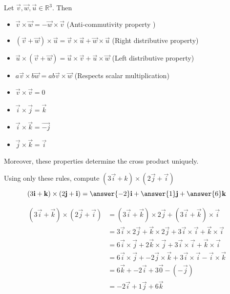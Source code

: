 \documentclass{ximera}
\begin{document}
\begin{theorem}

Let $\vec{v},\vec{w},\vec{u} \in \mathbb{R}^3$.  Then

	\begin{itemize}
		\item $\vec{v} \times \vec{w}  = -\vec{w} \times \vec{v}$ (Anti-commutivity property )
		\item $(\vec{v}+\vec{w}) \times \vec{u} = \vec{v} \times \vec{u}+\vec{w} \times \vec{u}$ (Right distributive property)
		\item $\vec{u} \times (\vec{v} +\vec{w}) = \vec{u} \times \vec{v}+\vec{u}\times\vec{w}$ (Left distributive property)
		\item $a\vec{v} \times b\vec{w} = ab \vec{v} \times \vec{w}$ (Respects scalar multiplication)
		\item $\vec{v} \times \vec{v} = 0$
		\item $\vec{i} \times \vec{j} = \vec{k}$
		\item $\vec{i} \times \vec{k} = \vec{-j}$
		\item $\vec{j} \times \vec{k} = \vec{i}$
	\end{itemize}
	
	Moreover, these properties determine the cross product uniquely.
\end{theorem}

\begin{question}
	Using only these rules, compute $(3\vec{i}+k) \times (2\vec{j}+\vec{i})$
	\[
	(3\vec{i}+\vec{k}) \times (2\vec{j}+\vec{i}) = \answer{-2}\vec{i}+\answer{1}\vec{j}+\answer{6}\vec{k}
	\]
	
	\begin{hint}
		\begin{align*}
		(3\vec{i}+\vec{k}) \times (2\vec{j}+\vec{i}) &= (3\vec{i}+\vec{k}) \times 2\vec{j}+(3\vec{i}+\vec{k}) \times\vec{i}\\
			&=3\vec{i} \times 2\vec{j}+\vec{k}\times 2\vec{j}+3\vec{i} \times \vec{i} +\vec{k} \times \vec{i}\\
			&=6 \vec{i} \times \vec{j}+2 \vec{k} \times \vec{j}+3\vec{i} \times \vec{i} +\vec{k} \times \vec{i}\\
			&=6 \vec{i} \times \vec{j}+-2 \vec{j} \times \vec{k}+3\vec{i} \times \vec{i} -\vec{i} \times \vec{k}\\
			&=6 \vec{k}+-2 \vec{i}+3\vec{0} -(-\vec{j})\\
			&=-2\vec{i}+1\vec{j}+6\vec{k}
		\end{align*}
	\end{hint}
\end{question}
\end{document}
